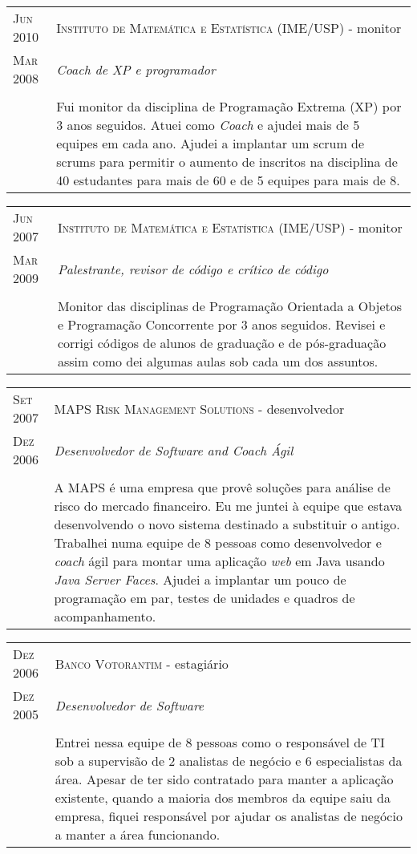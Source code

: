 \documentclass[letter,10pt]{article}
\begin{document}
\begin{tabular}{p{2.5cm}|p{13.5cm}}
  \textsc{Jun 2010} & \textsc{Instituto de Matemática e Estatística
    (IME/USP)} - monitor\\
  \textsc{Mar 2008}& \emph{Coach de XP e programador}\\
  &\\
  & Fui monitor da disciplina de Programação Extrema (XP) por 3 anos
  seguidos. Atuei como \textit{Coach} e ajudei mais de 5 equipes em
  cada ano. Ajudei a implantar um scrum de scrums para permitir o
  aumento de inscritos na disciplina de 40 estudantes para mais de 60
  e de 5 equipes para mais de 8.
\end{tabular}

\begin{tabular}{p{2.5cm}|p{13.5cm}}
  \textsc{Jun 2007} & \textsc{Instituto de Matemática e Estatística
    (IME/USP)} - monitor\\
  \textsc{Mar 2009}& \emph{Palestrante, revisor de código e crítico
    de código}\\
  &\\
  &Monitor das disciplinas de Programação Orientada a Objetos e
  Programação Concorrente por 3 anos seguidos. Revisei e corrigi
  códigos de alunos de graduação e de pós-graduação assim como dei
  algumas aulas sob cada um dos assuntos.
\end{tabular}


\begin{tabular}{p{2.5cm}|p{13.5cm}}
  \textsc{Set 2007} & \textsc{MAPS Risk
    Management Solutions} - desenvolvedor\\
  \textsc{Dez 2006} &\emph{Desenvolvedor de Software and Coach Ágil}\\
  &\\
  & A MAPS é uma empresa que provê soluções para análise de risco do
  mercado financeiro. Eu me juntei à equipe que estava desenvolvendo o
  novo sistema destinado a substituir o antigo. Trabalhei numa equipe
  de 8 pessoas como desenvolvedor e \textit{coach} ágil para montar
  uma aplicação \textit{web} em Java usando \textit{Java Server
    Faces}. Ajudei a implantar um pouco de programação em par, testes
  de unidades e quadros de acompanhamento.
\end{tabular}

\begin{tabular}{p{2.5cm}|p{13.5cm}}
  \textsc{Dez 2006} & \textsc{Banco Votorantim} - estagiário\\
  \textsc{Dez 2005} &\emph{Desenvolvedor de Software}\\
  &\\
  &Entrei nessa equipe de 8 pessoas como o responsável de TI sob a
  supervisão de 2 analistas de negócio e 6 especialistas da área. Apesar de
  ter sido contratado para manter a aplicação existente, quando a
  maioria dos membros da equipe saiu da empresa, fiquei responsável
  por ajudar os analistas de negócio a manter a área funcionando.
\end{tabular}
\end{document}
